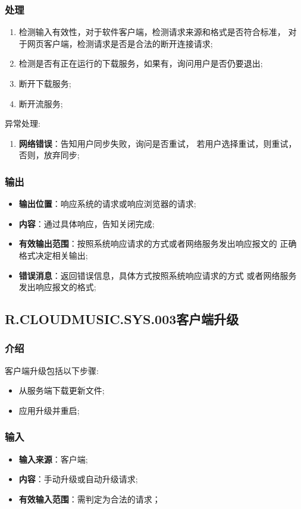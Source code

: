 \begin{enumerate}
\subsubsection{处理}
	\begin{enumerate}
		\item 检测输入有效性，对于软件客户端，检测请求来源和格式是否符合标准，
			对于网页客户端，检测请求是否是合法的断开连接请求;
		\item 检测是否有正在运行的下载服务，如果有，询问用户是否仍要退出;
		\item 断开下载服务;
		\item 断开流服务;
	\end{enumerate}
	\noindent 异常处理:
	\begin{enumerate}
		\item \textbf{网络错误}：告知用户同步失败，询问是否重试，
			若用户选择重试，则重试，否则，放弃同步;
	\end{enumerate}
\subsubsection{输出}
\begin{itemize}
	\item \textbf{输出位置}：响应系统的请求或响应浏览器的请求;
	\item \textbf{内容}：通过具体响应，告知关闭完成;
	\item \textbf{有效输出范围}：按照系统响应请求的方式或者网络服务发出响应报文的
		正确格式决定相关输出;
	\item \textbf{错误消息}：返回错误信息，具体方式按照系统响应请求的方式
		或者网络服务发出响应报文的格式;
\end{itemize}

\subsection{R.CLOUDMUSIC.SYS.003客户端升级}
\subsubsection{介绍}
客户端升级包括以下步骤:
	\begin{itemize}
		\item 从服务端下载更新文件;
		\item 应用升级并重启;
	\end{itemize}
\subsubsection{输入}
	\begin{itemize}
		\item \textbf{输入来源}：客户端;
		\item \textbf{内容}：手动升级或自动升级请求;
		\item \textbf{有效输入范围}：需判定为合法的请求；
	\end{itemize}

\end{enumerate}
